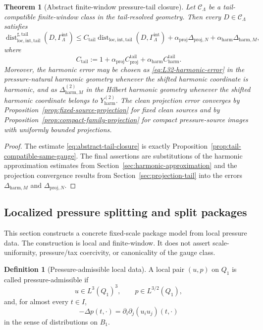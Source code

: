 \documentclass[11pt]{article}
\numberwithin{equation}{section}
\newtheorem{theorem}{Theorem}[section]
\theoremstyle{definition}
\newtheorem{definition}[definition]{Definition}
\theoremstyle{remark}
\DeclareMathOperator{\dist}{dist}
\newcommand{\loc}{\mathrm{loc}}
\newcommand{\intg}{\mathrm{int}}
\newcommand{\tail}{\mathrm{tail}}
\newcommand{\proj}{\mathrm{proj}}
\newcommand{\harm}{\mathrm{harm}}
\newcommand{\calC}{\mathcal C}
\newcommand{\Gammaint}{\Gamma^{\intg}_{\Lambda}}
\begin{document}
\begin{theorem}[Abstract finite-window pressure-tail closure]\label{thm:abstract-tail-closure}
Let $\calC_\Lambda$ be a tail-compatible finite-window class in the tail-resolved geometry.
Then every $D\in\calC_\Lambda$ satisfies
\begin{equation}\label{eq:abstract-tail-closure}
\dist^{\sharp,\tail}_{\loc,\intg,\tail}(D,\Gammaint)
\le
C_{\tail}
\dist_{\loc,\intg,\tail}(D,\Gammaint)
+
\alpha_{\proj}\Delta_{\proj,N}
+
\alpha_{\harm}\Delta_{\harm,M},
\end{equation}
where
\[
        C_{\tail}:=1+\alpha_{\proj}C^{\tail}_{\proj}
        +\alpha_{\harm}C^{\tail}_{\harm}.
\]
Moreover, the harmonic error may be chosen as \eqref{eq:L32-harmonic-error} in the
pressure-natural harmonic geometry whenever the shifted harmonic coordinate is harmonic,
and as $\Delta^{(2)}_{\harm,M}$ in the Hilbert harmonic geometry whenever the shifted
harmonic coordinate belongs to $Y^{(2)}_{\harm}$.  The clean projection error converges by
Proposition~\ref{prop:fixed-source-projection} for fixed clean sources and by
Proposition~\ref{prop:compact-family-projection} for compact pressure-source images with uniformly
bounded projections.
\end{theorem}

\begin{proof}
The estimate \eqref{eq:abstract-tail-closure} is exactly
Proposition~\ref{prop:tail-compatible-same-gauge}.  The final assertions are substitutions of the
harmonic approximation estimates from Section~\ref{sec:harmonic-approximation} and the projection
convergence results from Section~\ref{sec:projection-tail} into the errors
$\Delta_{\harm,M}$ and $\Delta_{\proj,N}$.
\end{proof}

\subsection{Localized pressure splitting and split packages}
\label{sec:localized-split-packages}

This section constructs a concrete fixed-scale package model from local pressure data.  The
construction is local and finite-window.  It does not assert scale-uniformity, pressure/tax
coercivity, or canonicality of the gauge class.

\begin{definition}[Pressure-admissible local data]\label{def:pressure-admissible-data}
A local pair $(u,p)$ on $Q_1$ is called pressure-admissible if
\[
        u\in L^3(Q_1)^3,
        \qquad
        p\in L^{3/2}(Q_1),
\]
and, for almost every $t\in I$,
\[
        -\Delta p(t,\cdot)=\partial_i\partial_j(u_i u_j)(t,\cdot)
\]
in the sense of distributions on $B_1$.
\end{definition}
\end{document}
